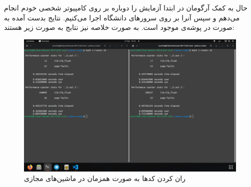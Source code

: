 حال به کمک آرگومان
در ابتدا آزمایش را دوباره بر روی کامپیوتر شخصی خودم
انجام می‌دهم و سپس آنرا بر روی سرور‌های دانشگاه اجرا می‌کنیم.
نتایج بدست آمده به صورت
در پوشه‌ی
موجود است. به صورت خلاصه نیز نتابج به صورت زیر هستند:
\begin{figure}[H]
    \centering
    \includegraphics[scale=0.25]{pic/1-vm.png}
    \caption{ران کردن کد‌ها به صورت همزمان در ماشین‌های مجازی}
\end{figure}
